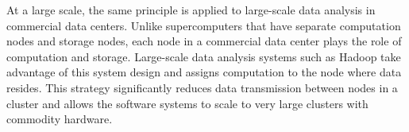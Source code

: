 \documentclass[12pt]{report}
\begin{document}
At a large scale, the same principle is applied to large-scale data analysis in
commercial data centers. Unlike supercomputers that have separate computation
nodes and storage nodes, each node in a commercial data center plays the role of
computation and storage. Large-scale data analysis systems such as Hadoop take
advantage of this system design and assigns computation to the node where data
resides. This strategy significantly reduces data transmission between nodes in
a cluster and allows the software systems to scale to very large clusters with
commodity hardware.

\newpage


\end{document}

